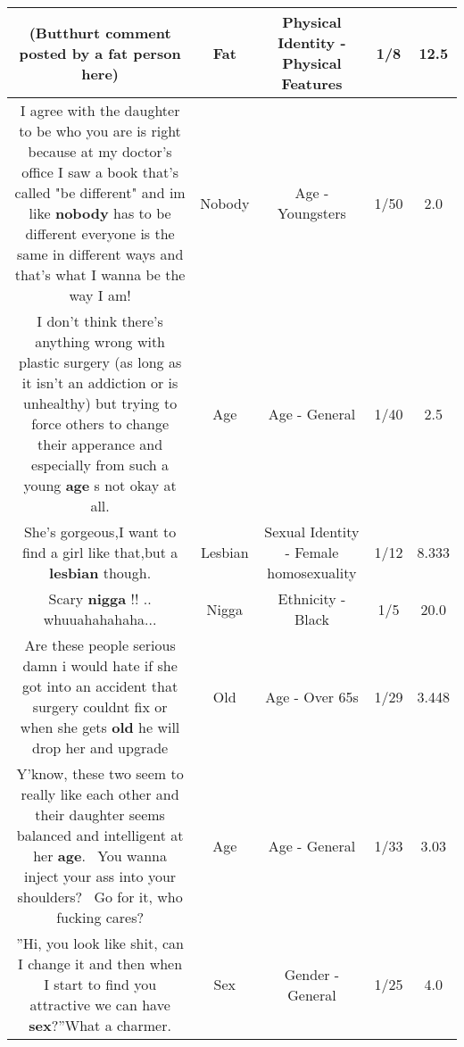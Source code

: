 \documentclass[11pt]{article}
\newlength\mylength
\begin{document}
\begin{center}
\begin{longtable}{|C{.65\mylength}|C{.30\mylength}|C{.12\mylength}|C{.12\mylength}|C{.12\mylength}|}
  \small (Butthurt comment posted by a \textbf{fat} person here)\normalsize   & Fat & Physical Identity - Physical Features & 1/8 & 12.5 \\  \hline
  \small I agree with the daughter to be who you are is right because at my doctor's office I saw a book that's called "be different" and im like \textbf{nobody} has to be different everyone is the same in different ways and that's what I wanna be the way I am!\normalsize   & Nobody & Age - Youngsters & 1/50 & 2.0 \\  \hline
  \small I don't think there's anything wrong with plastic surgery (as long as it isn't an addiction or is unhealthy) but trying to force others to change their apperance and especially from such a young \textbf{age} s not okay at all.\normalsize   & Age & Age - General & 1/40 & 2.5 \\  \hline
  \small She's gorgeous,I want to find a girl like that,but a \textbf{lesbian} though.\normalsize   & Lesbian & Sexual Identity - Female homosexuality & 1/12 & 8.333 \\  \hline
  \small Scary \textbf{nigga} !! .. whuuahahahaha...\normalsize   & Nigga & Ethnicity - Black & 1/5 & 20.0 \\  \hline
  \small Are these people serious damn i would hate if she got into an accident that surgery couldnt fix or when she gets \textbf{old} he will drop her and upgrade\normalsize   & Old & Age - Over 65s & 1/29 & 3.448 \\  \hline
  \small Y'know, these two seem to really like each other and their daughter seems balanced and intelligent at her \textbf{age}.  You wanna inject your ass into your shoulders?  Go for it, who fucking cares?\normalsize   & Age & Age - General & 1/33 & 3.03 \\  \hline
  \small ''Hi, you look like shit, can I change it and then when I start to find you attractive we can have \textbf{sex}?''What a charmer.\normalsize   & Sex & Gender - General & 1/25 & 4.0 \\  \hline

\end{longtable}
\end{center}
\end{document}
